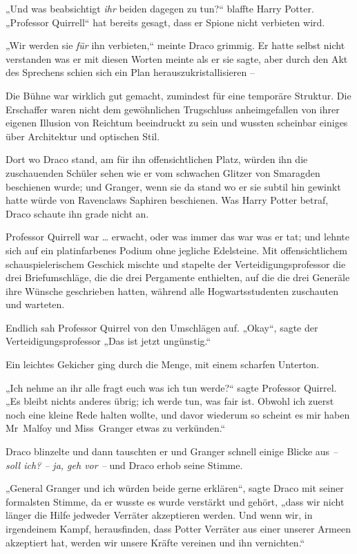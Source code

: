 {„Und was beabsichtigt \emph{ihr} beiden dagegen zu tun?“ blaffte Harry Potter. „Professor Quirrell“ hat bereits gesagt, dass er Spione nicht verbieten wird.

„Wir werden sie \emph{für} ihn verbieten,“ meinte Draco grimmig. Er hatte selbst nicht verstanden was er mit diesen Worten meinte als er sie sagte, aber durch den Akt des Sprechens schien sich ein Plan herauszukristallisieren --

Die Bühne war wirklich gut gemacht, zumindest für eine temporäre Struktur. Die Erschaffer waren nicht dem gewöhnlichen Trugschluss anheimgefallen von ihrer eigenen Illusion von Reichtum beeindruckt zu sein und wussten scheinbar einiges über Architektur und optischen Stil.

Dort wo Draco stand, am für ihn offensichtlichen Platz, würden ihn die zuschauenden Schüler sehen wie er vom schwachen Glitzer von Smaragden beschienen wurde; und Granger, wenn sie da stand wo er sie subtil hin gewinkt hatte würde von Ravenclaws Saphiren beschienen. Was Harry Potter betraf, Draco schaute ihn grade nicht an.

Professor Quirrell war … erwacht, oder was immer das war was er tat; und lehnte sich auf ein platinfarbenes Podium ohne jegliche Edelsteine. Mit offensichtlichem schauspielerischem Geschick mischte und stapelte der Verteidigungsprofessor die drei Briefumschläge, die die drei Pergamente enthielten, auf die die drei Generäle ihre Wünsche geschrieben hatten, während alle Hogwartsstudenten zuschauten und warteten.

Endlich sah Professor Quirrel von den Umschlägen auf. „Okay“, sagte der Verteidigungsprofessor „Das ist jetzt ungünstig.“

Ein leichtes Gekicher ging durch die Menge, mit einem scharfen Unterton.

„Ich nehme an ihr alle fragt euch was ich tun werde?“ sagte Professor Quirrel. „Es bleibt nichts anderes übrig; ich werde tun, was fair ist. Obwohl ich zuerst noch eine kleine Rede halten wollte, und davor wiederum so scheint es mir haben Mr~Malfoy und Miss~Granger etwas zu verkünden.“

Draco blinzelte und dann tauschten er und Granger schnell einige Blicke aus \emph{-- soll ich? -- ja, geh vor --} und Draco erhob seine Stimme.

„General Granger und ich würden beide gerne erklären“, sagte Draco mit seiner formalsten Stimme, da er wusste es wurde verstärkt und gehört, „dass wir nicht länger die Hilfe jedweder Verräter akzeptieren werden. Und wenn wir, in irgendeinem Kampf, herausfinden, dass Potter Verräter aus einer unserer Armeen akzeptiert hat, werden wir unsere Kräfte vereinen und ihn vernichten.“

}
